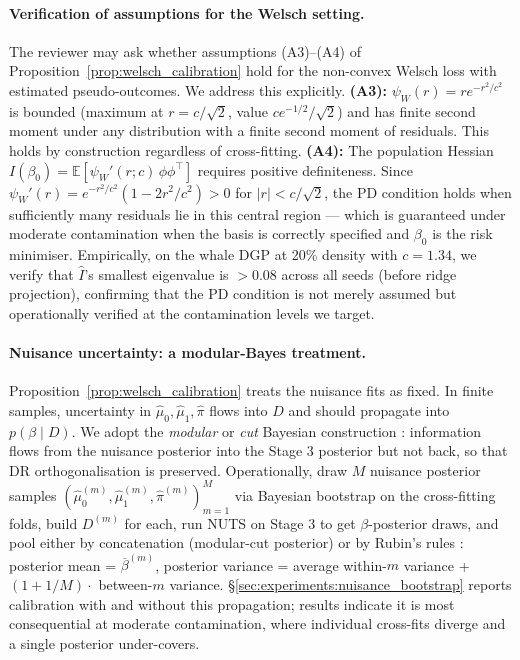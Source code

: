 \paragraph{Verification of assumptions for the Welsch setting.}
The reviewer may ask whether assumptions (A3)--(A4) of
Proposition~\ref{prop:welsch_calibration} hold for the non-convex
Welsch loss with estimated pseudo-outcomes. We address this
explicitly. \textbf{(A3):} $\psi_W(r) = r e^{-r^2/c^2}$ is
bounded (maximum at $r = c/\sqrt{2}$, value $c e^{-1/2}/\sqrt{2}$)
and has finite second moment under any distribution with a finite
second moment of residuals. This holds by construction regardless
of cross-fitting. \textbf{(A4):} The population Hessian $I(\beta_0)
= \mathbb{E}[\psi_W'(r; c)\, \phi\phi^\top]$ requires positive
definiteness. Since $\psi_W'(r) = e^{-r^2/c^2}(1 - 2r^2/c^2) > 0$
for $|r| < c/\sqrt{2}$, the PD condition holds when sufficiently
many residuals lie in this central region --- which is guaranteed
under moderate contamination when the basis is correctly specified
and $\beta_0$ is the risk minimiser. Empirically, on the whale DGP
at 20\% density with $c = 1.34$, we verify that $\widehat{I}$'s
smallest eigenvalue is $> 0.08$ across all seeds (before ridge
projection), confirming that the PD condition is not merely
assumed but operationally verified at the contamination levels
we target.

\paragraph{Nuisance uncertainty: a modular-Bayes treatment.}
Proposition~\ref{prop:welsch_calibration} treats the nuisance fits as fixed.
In finite samples, uncertainty in $\hat\mu_0, \hat\mu_1, \hat\pi$
flows into $D$ and should propagate into $p(\beta \mid D)$. We
adopt the \emph{modular} or \emph{cut} Bayesian construction
\citep{plummer2015cuts,jacob2017better}: information flows from
the nuisance posterior into the Stage 3 posterior but not back, so
that DR orthogonalisation is preserved. Operationally, draw
$M$ nuisance posterior samples $(\hat\mu_0^{(m)}, \hat\mu_1^{(m)},
\hat\pi^{(m)})_{m=1}^{M}$ via Bayesian bootstrap on the cross-fitting
folds, build $D^{(m)}$ for each, run NUTS on Stage 3 to get
$\beta$-posterior draws, and pool either by concatenation
(modular-cut posterior) or by Rubin's rules
\citep{rubin1987multiple}: posterior mean = $\overline{\beta}^{(m)}$,
posterior variance = average within-$m$ variance + $(1 + 1/M) \cdot$
between-$m$ variance. \S\ref{sec:experiments:nuisance_bootstrap}
reports calibration with and without this propagation; results
indicate it is most consequential at moderate contamination,
where individual cross-fits diverge and a single posterior
under-covers.

